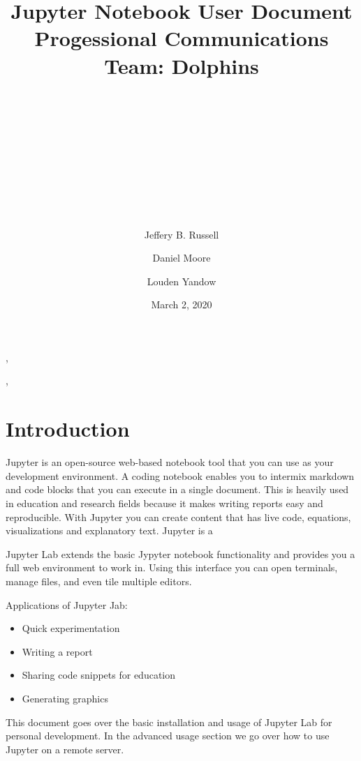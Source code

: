 \documentclass[pdftex,12pt]{artikel3}
\title{
\begin{center}
\huge{Jupyter Notebook User Document} \\
\huge{Progessional Communications}\\
\newline
\huge{Team: Dolphins}\\
\end{center}
\\
\\
\\
\\
\author{} %
\date{}   %
}
\begin{document}
\maketitle


\begin{center}

\author{Jeffery B. Russell},
\author{Daniel Moore},
\author{Louden Yandow}

\date{March 2, 2020}
\end{center}

\newpage

\tableofcontents
{}
\newpage
\listoffigures
{}

\newpage

\section{Introduction}

Jupyter  is an open-source web-based notebook tool that you can use as your development environment.
A coding notebook enables you to intermix markdown and code blocks that you can execute in a single document. This is heavily used in education and research fields because it makes writing reports easy and reproducible. With Jupyter you can create content that has live code, equations, visualizations and explanatory text. Jupyter is a 

Jupyter Lab extends the basic Jypyter notebook functionality and provides you a full web environment to work in. Using this interface you can open terminals, manage files, and even tile multiple editors.

Applications of Jupyter Jab:

\begin{itemize}
  \item Quick experimentation
  \item Writing a report
  \item Sharing code snippets for education
  \item Generating graphics
\end{itemize}

This document goes over the basic installation and usage of Jupyter Lab for personal development. 
In the advanced usage section we go over how to use Jupyter on a remote server. 
\end{document}
